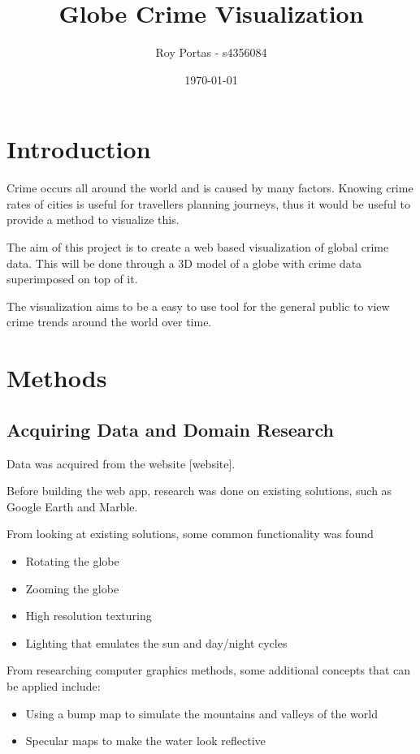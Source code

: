 \documentclass[]{article}
\begin{document}
\title{Globe Crime Visualization}
\author{Roy Portas - s4356084}
\date{\today}
\maketitle 

\section{Introduction}

Crime occurs all around the world and is caused by many factors.
Knowing crime rates of cities is useful for travellers planning journeys, thus it would be useful to provide a
method to visualize this.

The aim of this project is to create a web based visualization of global crime data.
This will be done through a 3D model of a globe with crime data superimposed on top of it.

The visualization aims to be a easy to use tool for the general public to view crime trends around the world over time.

\section{Methods}

\subsection{Acquiring Data and Domain Research}

Data was acquired from the website [website].

Before building the web app, research was done on existing solutions, such as Google Earth and Marble.

From looking at existing solutions, some common functionality was found

\begin{itemize}
	\item Rotating the globe
	\item Zooming the globe
	\item High resolution texturing
	\item Lighting that emulates the sun and day/night cycles
\end{itemize}

From researching computer graphics methods, some additional concepts that can be applied include:

\begin{itemize}
	\item Using a bump map to simulate the mountains and valleys of the world
	\item Specular maps to make the water look reflective
\end{itemize}
\end{document}

